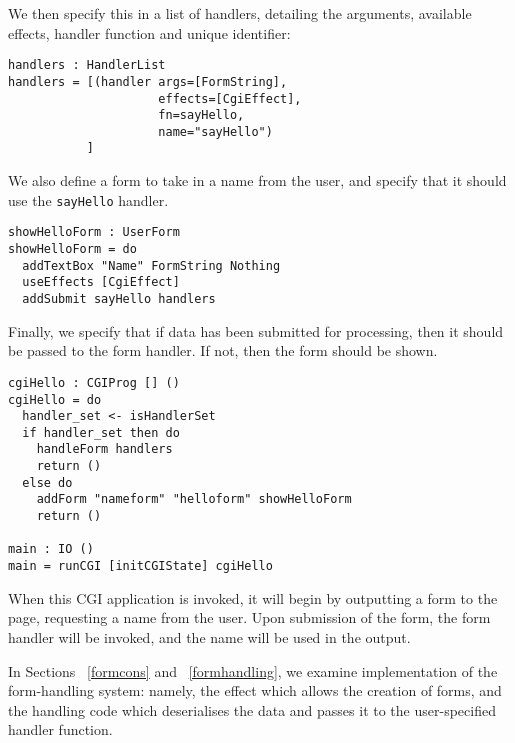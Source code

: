 We then specify this in a list of handlers, detailing the arguments, available effects, handler function and unique identifier:

\begin{Verbatim}
handlers : HandlerList
handlers = [(handler args=[FormString], 
                     effects=[CgiEffect], 
                     fn=sayHello, 
                     name="sayHello")
           ]
\end{Verbatim}

We also define a form to take in a name from the user, and specify that it should use the \texttt{sayHello} handler.

\begin{Verbatim}
showHelloForm : UserForm
showHelloForm = do
  addTextBox "Name" FormString Nothing
  useEffects [CgiEffect]
  addSubmit sayHello handlers
\end{Verbatim}

Finally, we specify that if data has been submitted for processing, then it should be passed to the form handler. If not, then the form should be shown.

\begin{Verbatim}
cgiHello : CGIProg [] ()
cgiHello = do
  handler_set <- isHandlerSet
  if handler_set then do
    handleForm handlers
    return ()
  else do
    addForm "nameform" "helloform" showHelloForm
    return ()

main : IO ()
main = runCGI [initCGIState] cgiHello
\end{Verbatim}
When this CGI application is invoked, it will begin by outputting a form to the
page, requesting a name from the user. Upon submission of the form, the form
handler will be invoked, and the name will be used in the output.

In Sections ~\ref{formcons} and ~\ref{formhandling}, we examine implementation
of the form-handling system: namely, the effect which allows the creation of
forms, and the handling code which deserialises the data and passes it to the
user-specified handler function.  

